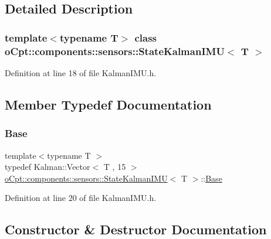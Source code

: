 \subsection{Detailed Description}
\subsubsection*{template$<$typename T$>$\newline
class o\+Cpt\+::components\+::sensors\+::\+State\+Kalman\+I\+M\+U$<$ T $>$}



Definition at line 18 of file Kalman\+I\+M\+U.\+h.



\subsection{Member Typedef Documentation}
\hypertarget{classo_cpt_1_1components_1_1sensors_1_1_state_kalman_i_m_u_a47c8a24bf766e317c7c6374689467264}{}\label{classo_cpt_1_1components_1_1sensors_1_1_state_kalman_i_m_u_a47c8a24bf766e317c7c6374689467264} 
\subsubsection{\texorpdfstring{Base}{Base}}
{\footnotesize\ttfamily template$<$typename T $>$ \\
typedef Kalman\+::\+Vector$<$ T , 15 $>$ \hyperlink{classo_cpt_1_1components_1_1sensors_1_1_state_kalman_i_m_u}{o\+Cpt\+::components\+::sensors\+::\+State\+Kalman\+I\+MU}$<$ T $>$\+::\hyperlink{classo_cpt_1_1components_1_1sensors_1_1_state_kalman_i_m_u_a47c8a24bf766e317c7c6374689467264}{Base}}



Definition at line 20 of file Kalman\+I\+M\+U.\+h.



\subsection{Constructor \& Destructor Documentation}
\hypertarget{classo_cpt_1_1components_1_1sensors_1_1_state_kalman_i_m_u_a2877c1b6028be91d85c9fb4eef28c158}{}\label{classo_cpt_1_1components_1_1sensors_1_1_state_kalman_i_m_u_a2877c1b6028be91d85c9fb4eef28c158} 
